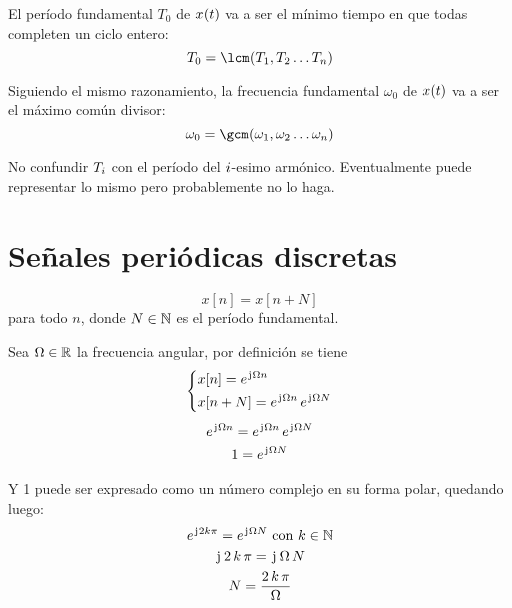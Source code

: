 El período fundamental $T_0$ de $\fx[x]{t}$ va a ser el mínimo tiempo en que todas completen un ciclo entero:
\[
    T_0 = \fx[\lcm]{T_1, T_2 \dots T_\nth}
\]

Siguiendo el mismo razonamiento, la frecuencia fundamental $\omega_0$ de $\fx[x]{t}$ va a ser el máximo común divisor:
\[
    \omega_0 = \fx[\gcm]{\omega_1, \omega_2 \dots \omega_\nth}
\]

No confundir $T_\ith$ con el período del $\ith$-esimo armónico.
Eventualmente puede representar lo mismo pero probablemente no lo haga.

\section{Señales periódicas discretas}

\begin{mdframed}[style=DefinitionFrame]
    \begin{defn}
        \label{defn:funcDiscPeriod}
    \end{defn}
    \begin{equation*}
        x[n] = x[n+N]
    \end{equation*}
    para todo $n$, donde $N \in \setN$ es el período fundamental.
\end{mdframed}

Sea $\Omega \in \setR$ la frecuencia angular, por definición se tiene
\begin{gather*}
    \left\{
    \begin{aligned}
        & x[n] = e^{\iu \Omega n}
        \\
        & x[n+N] = e^{\iu \Omega n} \, e^{\iu \Omega N}
    \end{aligned}
    \right.
    \\[1ex]
    e^{\iu \Omega n} = e^{\iu \Omega n} \, e^{\iu \Omega N}
    \\
    1 = e^{\iu \Omega N}
\end{gather*}

Y 1 puede ser expresado como un número complejo en su forma polar, quedando luego:
\begin{gather*}
    e^{\iu 2 k \pi} = e^{\iu \Omega N} \text{ con $k \in \setN$}
    \\
    \iu \, 2 \, k \, \pi = \iu \, \Omega \, N
    \\
    N = \frac{2 \, k \, \pi}{\Omega}
\end{gather*}

